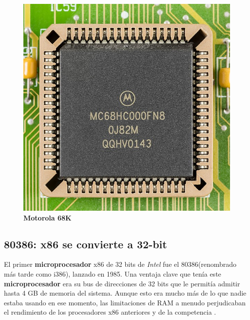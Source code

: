 \begin{figure}[htb]
	\centering
	\includegraphics[scale = 0.15]{Graphics/Motorola_MC68HC000FN8-0695.jpg}
	\caption{\textbf{Motorola 68K}}
	\label{fig:17}
\end{figure}

\subsection{80386: x86 se convierte a 32-bit}
El primer \textbf{microprocesador} x86 de 32 bits de \emph{Intel} fue el 80386(renombrado más tarde como i386), lanzado en 1985. Una ventaja clave que 
tenía este \textbf{microprocesador} era su bus de direcciones de 32 bits que le permitía admitir hasta 4 GB de memoria del sistema. Aunque esto era mucho 
más de lo que nadie estaba usando en ese momento, las limitaciones de RAM a menudo perjudicaban el rendimiento de los procesadores x86 anteriores y de la competencia 
.

